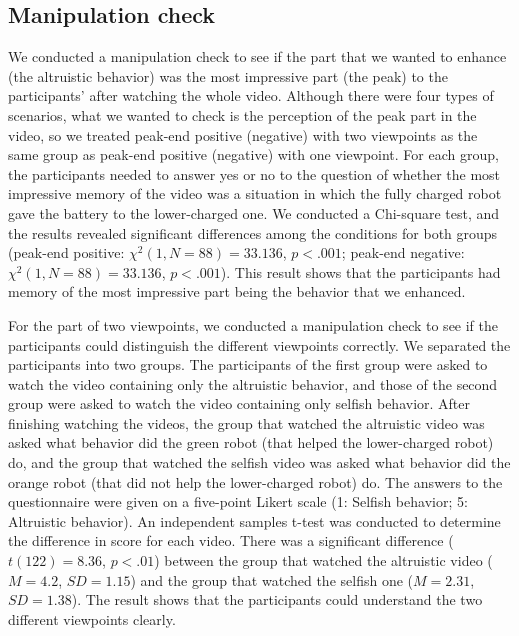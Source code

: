\documentclass[runningheads]{llncs}
\begin{document}
      

\subsection{Manipulation check}
We conducted a manipulation check to see if the part that we wanted to enhance (the altruistic behavior) was the most impressive part (the peak) to the participants' after watching the whole video. Although there were four types of scenarios, what we wanted to check is the perception of the peak part in the video, so we treated peak-end positive (negative) with two viewpoints as the same group as peak-end positive (negative) with one viewpoint. For each group, the participants needed to answer yes or no to the question of whether the most impressive memory of the video was a situation in which the fully charged robot gave the battery to the lower-charged one. We conducted a Chi-square test, and the results revealed significant differences among the conditions for both groups (peak-end positive: ${\chi}^2(1,N=88)=33.136$, $p<.001$; peak-end negative: ${\chi}^2(1,N=88)=33.136$, $p<.001$). This result shows that the participants had memory of the most impressive part being the behavior that we enhanced.

For the part of two viewpoints, we conducted a manipulation check to see if the participants could distinguish the different viewpoints correctly. We separated the participants into two groups. The participants of the first group were asked to watch the video containing only the altruistic behavior, and those of the second group were asked to watch the video containing only selfish behavior. After finishing watching the videos, the group that watched the altruistic video was asked what behavior did the green robot (that helped the lower-charged robot) do, and the group that watched the selfish video was asked what behavior did the orange robot (that did not help the lower-charged robot) do. The answers to the questionnaire were given on a five-point Likert scale (1: Selfish behavior; 5: Altruistic behavior). An independent samples t-test was conducted to determine the difference in score for each video. There was a significant difference ($t(122)=8.36$, $p<.01$) between the group that watched the altruistic video ($M=4.2$, $SD=1.15$) and the group that watched the selfish one ($M=2.31$, $SD=1.38$). The result shows that the participants could understand the two different viewpoints clearly.
\end{document}
